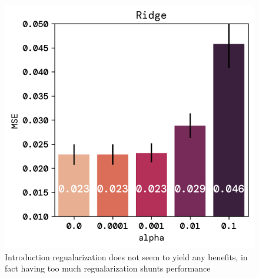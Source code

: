 \documentclass[twoside,11pt]{report}
\begin{document}
\begin{figure}[!ht]
\begin{minipage}[t]{0.5\textwidth - 1mm}
        \end{minipage}
        \hspace{2mm}
        \begin{minipage}[t]{0.5\textwidth - 1mm}
            \begin{center}
                \includegraphics[width=\textwidth]{../runsAndFigures/MSE_alpha.png}
            \end{center}
            \caption{Introduction regualarization does not seem to yield any benefits, in fact
            having too much regualarization shunts performance}\label{fig:MSE_aplha}
        \end{minipage}
    \end{figure}
\end{document}

